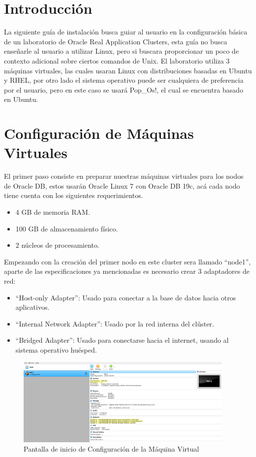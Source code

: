 \documentclass{article}
\begin{document}
\section{Introducción}

La siguiente guía de instalación busca guiar al usuario en la configuración básica de un laboratorio de Oracle Real Application Clusters, esta guía no busca enseñarle al usuario a utilizar Linux, pero si buscara proporcionar un poco de contexto adicional sobre ciertos comandos de Unix. El laboratorio utiliza 3 máquinas virtuales, las cuales usaran Linux con distribuciones basadas en Ubuntu y RHEL, por otro lado el sistema operativo puede ser cualquiera de preferencia por el usuario, pero en este caso se usará Pop\_Os!, el cual se encuentra basado en Ubuntu.

\section{Configuración de Máquinas Virtuales}

El primer paso consiste en preparar nuestras máquinas virtuales para los nodos de Oracle DB, estos usarán Oracle Linux 7 con Oracle DB 19c, acá cada nodo tiene cuenta con los siguientes requerimientos.

\begin{itemize}
	\item 4 GB de memoria RAM.
	\item 100 GB de almacenamiento físico.
	\item 2 núcleos de procesamiento.
\end{itemize}

Empezando con la creación del primer nodo en este cluster sera llamado ``node1'', aparte de las especificaciones ya mencionadas es necesario crear 3 adaptadores de red:

\begin{itemize}
	\item ``Host-only Adapter'': Usado para conectar a la base de datos hacia otros aplicativos.
	\item ``Internal Network Adapter'': Usado por la red interna del clúster.
	\item ``Bridged Adapter'': Usado para conectarse hacia el internet, usando al sistema operativo huésped.
\end{itemize}

\begin{figure}[H]
	\begin{center}
		\includegraphics[width=0.95\textwidth]{vm_base.png}
	\end{center}
	\caption{Pantalla de inicio de Configuración de la Máquina Virtual}
\end{figure}
\end{document}
